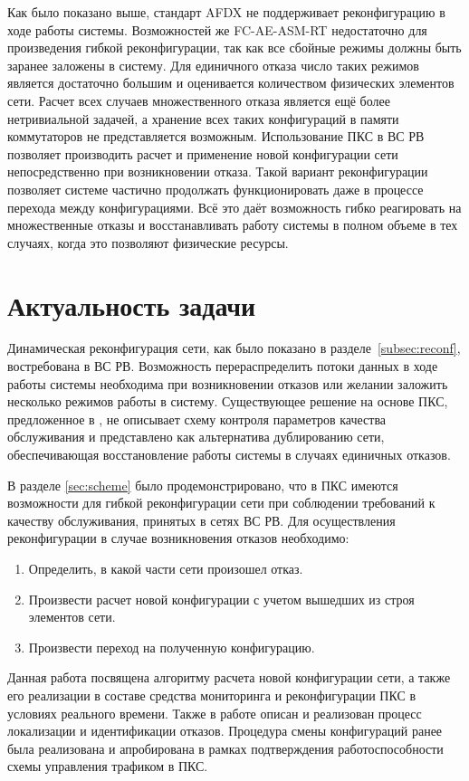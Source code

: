\documentclass[12pt, a4paper]{article}
\begin{document}
Как было показано выше, стандарт AFDX не поддерживает реконфигурацию в ходе работы системы. Возможностей же FC-AE-ASM-RT недостаточно для произведения гибкой реконфигурации, так как все сбойные режимы должны быть заранее заложены в систему. Для единичного отказа число таких режимов является достаточно большим и оценивается количеством физических элементов сети. Расчет всех случаев множественного отказа является ещё более нетривиальной задачей, а хранение всех таких конфигураций в памяти коммутаторов не представляется возможным. Использование ПКС в ВС РВ позволяет производить расчет и применение новой конфигурации сети непосредственно при возникновении отказа. Такой вариант реконфигурации позволяет системе частично продолжать функционировать даже в процессе перехода между конфигурациями. Всё это даёт возможность гибко реагировать на множественные отказы и восстанавливать работу системы в полном объеме в тех случаях, когда это позволяют физические ресурсы.


\section{Актуальность задачи}
Динамическая реконфигурация сети, как было показано в разделе~\ref{subsec:reconf}, востребована в ВС РВ. Возможность перераспределить потоки данных в ходе работы системы необходима при возникновении отказов или желании заложить несколько режимов работы в систему. Существующее решение на основе ПКС, предложенное в \cite{fakevlsdn}, не описывает схему контроля параметров качества обслуживания и представлено как альтернатива дублированию сети, обеспечивающая восстановление работы системы в случаях единичных отказов. 

В разделе \ref{sec:scheme} было продемонстрировано, что в ПКС имеются возможности для гибкой реконфигурации сети при соблюдении требований к качеству обслуживания, принятых в сетях ВС РВ. Для осуществления реконфигурации в случае возникновения отказов необходимо:
\begin{enumerate}
	\item Определить, в какой части сети произошел отказ.
	\item Произвести расчет новой конфигурации с учетом вышедших из строя элементов сети.
	\item Произвести переход на полученную конфигурацию.
\end{enumerate}

Данная работа посвящена алгоритму расчета новой конфигурации сети, а также его реализации в составе средства мониторинга и реконфигурации ПКС в условиях реального времени. Также в работе описан и реализован процесс локализации и идентификации отказов. Процедура смены конфигураций ранее была реализована и апробирована в рамках подтверждения работоспособности схемы управления трафиком в ПКС.
\end{document}
